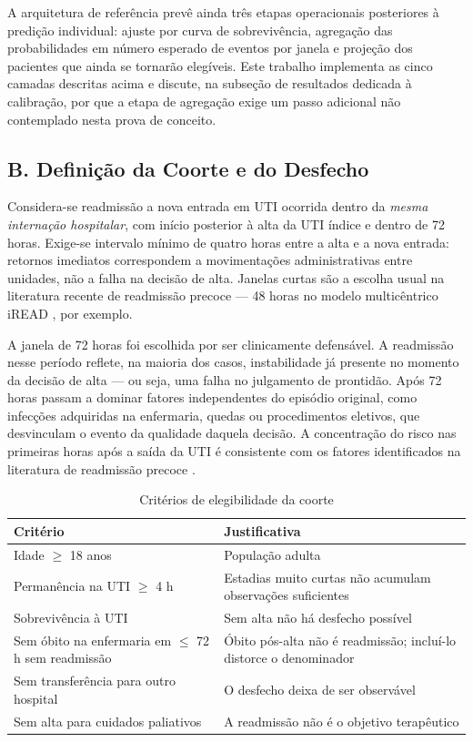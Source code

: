 \documentclass{ieeeaccess}
\begin{document}
A arquitetura de referência \cite{King2022} prevê ainda três etapas operacionais posteriores à predição individual: ajuste por curva de sobrevivência, agregação das probabilidades em número esperado de eventos por janela e projeção dos pacientes que ainda se tornarão elegíveis. Este trabalho implementa as cinco camadas descritas acima e discute, na subseção de resultados dedicada à calibração, por que a etapa de agregação exige um passo adicional não contemplado nesta prova de conceito.

\subsection*{B. Definição da Coorte e do Desfecho}
Considera-se readmissão a nova entrada em UTI ocorrida dentro da \textit{mesma internação hospitalar}, com início posterior à alta da UTI índice e dentro de 72 horas. Exige-se intervalo mínimo de quatro horas entre a alta e a nova entrada: retornos imediatos correspondem a movimentações administrativas entre unidades, não a falha na decisão de alta. Janelas curtas são a escolha usual na literatura recente de readmissão precoce --- 48 horas no modelo multicêntrico iREAD \cite{Lim2025}, por exemplo.

A janela de 72 horas foi escolhida por ser clinicamente defensável. A readmissão nesse período reflete, na maioria dos casos, instabilidade já presente no momento da decisão de alta --- ou seja, uma falha no julgamento de prontidão. Após 72 horas passam a dominar fatores independentes do episódio original, como infecções adquiridas na enfermaria, quedas ou procedimentos eletivos, que desvinculam o evento da qualidade daquela decisão. A concentração do risco nas primeiras horas após a saída da UTI é consistente com os fatores identificados na literatura de readmissão precoce \cite{Badilla2025}.

\begin{table}[!t]
\caption{Critérios de elegibilidade da coorte}
\label{tab:criterios}
\centering
\small
\begin{tabular}{p{2.6cm}p{5.0cm}}
\hline
\textbf{Critério} & \textbf{Justificativa} \\
\hline
Idade $\geq$ 18 anos & População adulta \\
Permanência na UTI $\geq$ 4 h & Estadias muito curtas não acumulam observações suficientes \\
Sobrevivência à UTI & Sem alta não há desfecho possível \\
Sem óbito na enfermaria em $\leq$ 72 h sem readmissão & Óbito pós-alta não é readmissão; incluí-lo distorce o denominador \\
Sem transferência para outro hospital & O desfecho deixa de ser observável \\
Sem alta para cuidados paliativos & A readmissão não é o objetivo terapêutico \\
\hline
\end{tabular}
\end{table}
\end{document}
